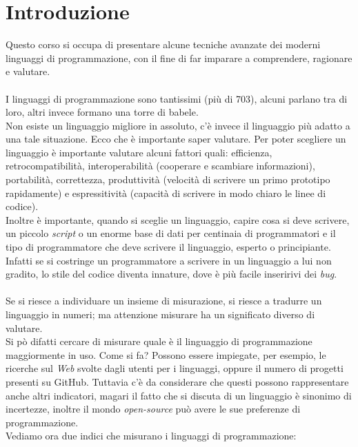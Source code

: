\documentclass[10pt,a4paper]{book}
\begin{document}
\chapter{Introduzione}
Questo corso si occupa di presentare alcune tecniche avanzate dei moderni linguaggi di programmazione, con il fine di far imparare  a comprendere, ragionare e valutare.\\\\
I linguaggi di programmazione sono tantissimi (pi\`u di 703), alcuni parlano tra di loro, altri invece formano una torre di babele.\\
Non esiste un linguaggio migliore in assoluto, c'\`e invece il linguaggio pi\`u adatto a una tale situazione. Ecco che \`e importante saper valutare. Per poter scegliere un linguaggio \`e importante valutare alcuni fattori quali: efficienza, retrocompatibilit\`a, interoperabilit\`a (cooperare e scambiare informazioni), portabilit\`a, correttezza, produttivit\`a (velocit\`a di scrivere un primo prototipo rapidamente) e espressitivit\`a (capacit\`a di scrivere in modo chiaro le linee di codice).\\
Inoltre \`e importante, quando si sceglie un linguaggio, capire cosa si deve scrivere, un piccolo \textit{script} o un enorme base di dati per centinaia di programmatori e il tipo di programmatore che deve scrivere il linguaggio, esperto o principiante. Infatti se si costringe un programmatore a scrivere in un linguaggio a lui non gradito, lo stile del codice diventa innature, dove \`e pi\`u facile inseririvi dei \textit{bug}.\\\\
Se si riesce a individuare un insieme di misurazione, si riesce a tradurre un linguaggio in numeri; ma attenzione misurare ha un significato diverso di valutare.\\
Si p\`o difatti cercare di misurare quale \`e il linguaggio di programmazione maggiormente in uso. Come si fa? Possono essere impiegate, per esempio, le ricerche sul \textit{Web} svolte dagli utenti per i linguaggi, oppure il numero di progetti presenti su GitHub. Tuttavia c'\`e da considerare che questi possono rappresentare anche altri indicatori, magari il fatto che si discuta di un linguaggio \`e sinonimo di incertezze, inoltre il mondo \textit{open-source} pu\`o avere le sue preferenze di programmazione.\\
Vediamo ora due indici che misurano i linguaggi di programmazione:
\end{document}
